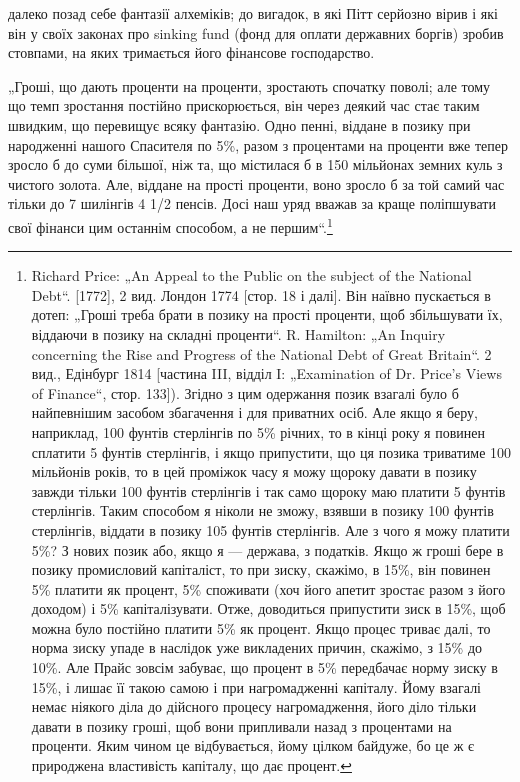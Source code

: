 \parcont{}  %
далеко позад себе фантазії алхеміків; до вигадок, в які Пітт
серйозно вірив і які він у своїх законах про sinking fund (фонд
для оплати державних боргів) зробив стовпами, на яких тримається
його фінансове господарство.

„Гроші, що дають проценти на проценти, зростають спочатку
поволі; але тому що темп зростання постійно прискорюється, він
через деякий час стає таким швидким, що перевищує всяку фантазію.
Одно пенні, віддане в позику при народженні нашого
Спасителя по 5\%, разом з процентами на проценти вже тепер
зросло б до суми більшої, ніж та, що містилася б в 150 мільйонах
земних куль з чистого золота. Але, віддане на прості проценти,
воно зросло б за той самий час тільки до 7 шилінгів 4 1/2 пенсів.
Досі наш уряд вважав за краще поліпшувати свої фінанси цим
останнім способом, а не першим“.\footnote{
Richard Price: „An Appeal to the Public on the subject of the National Debt“.
[1772], 2 вид. Лондон 1774 [стор. 18 і далі]. Він наївно пускається в дотеп: „Гроші
треба брати в позику на прості проценти, щоб збільшувати їх, віддаючи в позику
на складні проценти“. R. Hamilton: „An Inquiry concerning the Rise and
Progress of the National Debt of Great Britain“. 2 вид., Едінбург 1814 [частина III,
відділ I: „Examination of Dr. Price’s Views of Finance“, стор. 133]). Згідно з цим
одержання позик взагалі було б найпевнішим засобом збагачення і для приватних
осіб. Але якщо я беру, наприклад, 100 фунтів стерлінгів по 5\% річних,
то в кінці року я повинен сплатити 5 фунтів стерлінгів, і якщо припустити, що
ця позика триватиме 100 мільйонів років, то в цей проміжок часу я можу щороку
давати в позику завжди тільки 100 фунтів стерлінгів і так само щороку маю платити
5 фунтів стерлінгів. Таким способом я ніколи не зможу, взявши в позику
100 фунтів стерлінгів, віддати в позику 105 фунтів стерлінгів. Але з чого я можу
платити 5\%? З нових позик або, якщо я — держава, з податків. Якщо ж гроші
бере в позику промисловий капіталіст, то при зиску, скажімо, в 15\%, він повинен
5\% платити як процент, 5\% споживати (хоч його апетит зростає разом
з його доходом) і 5\% капіталізувати. Отже, доводиться припустити зиск в 15\%,
щоб можна було постійно платити 5\% як процент. Якщо процес триває далі, то
норма зиску упаде в наслідок уже викладених причин, скажімо, з 15\% до 10\%.
Але Прайс зовсім забуває, що процент в 5\% передбачає норму зиску в 15\%,
і лишає її такою самою і при нагромадженні капіталу. Йому взагалі немає ніякого
діла до дійсного процесу нагромадження, його діло тільки давати в позику
гроші, щоб вони припливали назад з процентами на проценти. Яким чином
це відбувається, йому цілком байдуже, бо це ж є природжена властивість
капіталу, що дає процент.
}

